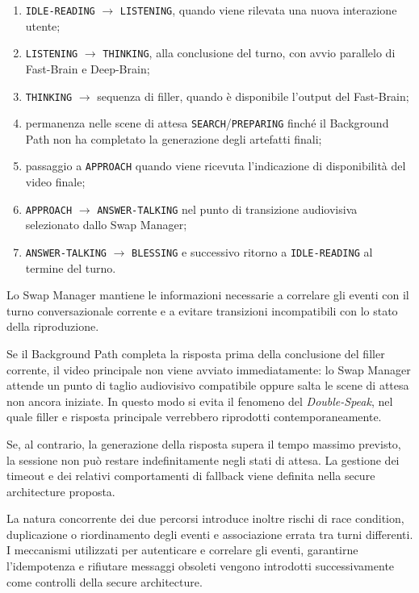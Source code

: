 \documentclass[11pt,a4paper]{article}
\begin{document}
\begin{enumerate}
    \item \texttt{IDLE-READING} $\rightarrow$ \texttt{LISTENING},
    quando viene rilevata una nuova interazione utente;

    \item \texttt{LISTENING} $\rightarrow$ \texttt{THINKING},
    alla conclusione del turno, con avvio parallelo di Fast-Brain e
    Deep-Brain;

    \item \texttt{THINKING} $\rightarrow$ sequenza di filler,
    quando è disponibile l'output del Fast-Brain;

    \item permanenza nelle scene di attesa
    \texttt{SEARCH}/\texttt{PREPARING} finché il Background Path
    non ha completato la generazione degli artefatti finali;

    \item passaggio a \texttt{APPROACH} quando viene ricevuta
    l'indicazione di disponibilità del video finale;

    \item \texttt{APPROACH} $\rightarrow$ \texttt{ANSWER-TALKING}
    nel punto di transizione audiovisiva selezionato dallo Swap Manager;

    \item \texttt{ANSWER-TALKING} $\rightarrow$ \texttt{BLESSING}
    e successivo ritorno a \texttt{IDLE-READING} al termine del turno.
\end{enumerate}

Lo Swap Manager mantiene le informazioni necessarie a correlare gli
eventi con il turno conversazionale corrente e a evitare transizioni
incompatibili con lo stato della riproduzione.

Se il Background Path completa la risposta prima della conclusione del
filler corrente, il video principale non viene avviato immediatamente:
lo Swap Manager attende un punto di taglio audiovisivo compatibile oppure
salta le scene di attesa non ancora iniziate. In questo modo si evita il
fenomeno del \emph{Double-Speak}, nel quale filler e risposta principale
verrebbero riprodotti contemporaneamente.

Se, al contrario, la generazione della risposta supera il tempo massimo
previsto, la sessione non può restare indefinitamente negli stati di
attesa. La gestione dei timeout e dei relativi comportamenti di fallback
viene definita nella secure architecture proposta.

La natura concorrente dei due percorsi introduce inoltre rischi di race
condition, duplicazione o riordinamento degli eventi e associazione
errata tra turni differenti. I meccanismi utilizzati per autenticare e
correlare gli eventi, garantirne l'idempotenza e rifiutare messaggi
obsoleti vengono introdotti successivamente come controlli della secure
architecture.
\end{document}
